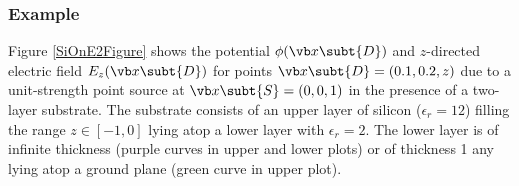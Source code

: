 \documentclass[letterpaper]{article}
\begin{document}
\subsubsection{Example}

Figure \ref{SiOnE2Figure} shows the potential
$\phi(\vb x\subt{D})$ and $z$-directed electric field 
$E_z(\vb x\subt{D})$
for points $\vb x\subt{D}=(0.1,0.2,z)$
due to a unit-strength point source at $\vb x\subt{S}=(0,0,1)$
in the presence of a two-layer substrate.
The substrate 
consists of an upper layer of silicon ($\epsilon_r=12$)
filling the range $z\in[-1,0]$ lying atop a lower layer with 
$\epsilon_r=2$. 
The lower layer is of infinite thickness 
(purple curves in upper and lower plots) 
or of thickness 1 any lying atop a ground plane (green
curve in upper plot).
\end{document}
